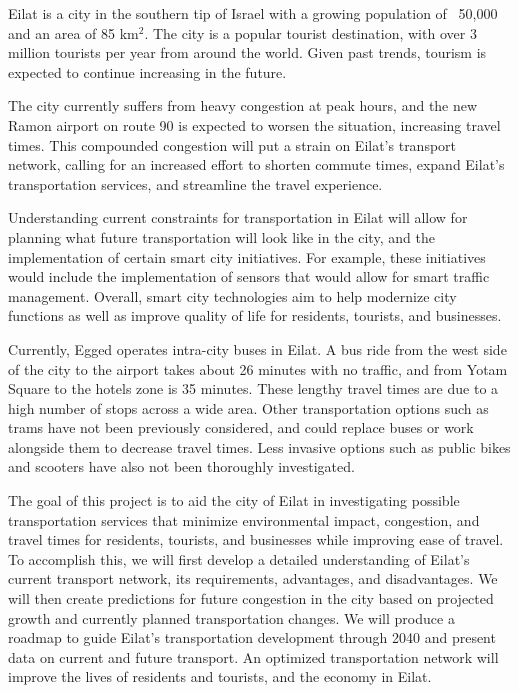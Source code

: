 \documentclass[12pt]{article}                         %
\begin{document}
Eilat is a city in the southern tip of Israel with a growing population of ~50,000 and an area of 85 km$^2$. The city is a popular tourist destination, with over 3 million tourists per year from around the world. Given past trends, tourism is expected to continue increasing in the future.

The city currently suffers from heavy congestion at peak hours, and the new Ramon airport on route 90 is expected to worsen the situation, increasing travel times. This compounded congestion will put a strain on Eilat's transport network, calling for an increased effort to shorten commute times, expand Eilat's transportation services, and streamline the travel experience.

Understanding current constraints for transportation in Eilat will allow for planning what future transportation will look like in the city, and the implementation of certain smart city initiatives. For example, these initiatives would include the implementation of sensors that would allow for smart traffic management. Overall, smart city technologies aim to help modernize city functions as well as improve quality of life for residents, tourists, and businesses.

Currently, Egged operates intra-city buses in Eilat. A bus ride from the west side of the city to the airport takes about 26 minutes with no traffic, and from Yotam Square to the hotels zone is 35 minutes. These lengthy travel times are due to a high number of stops across a wide area. Other transportation options such as trams have not been previously considered, and could replace buses or work alongside them to decrease travel times. Less invasive options such as public bikes and scooters have also not been thoroughly investigated.

The goal of this project is to aid the city of Eilat in investigating possible transportation services that minimize environmental impact, congestion, and travel times for residents, tourists, and businesses while improving ease of travel. To accomplish this, we will first develop a detailed understanding of Eilat's current transport network, its requirements, advantages, and disadvantages. We will then create predictions for future congestion in the city based on projected growth and currently planned transportation changes. We will produce a roadmap to guide Eilat's transportation development through 2040 and present data on current and future transport. An optimized transportation network will improve the lives of residents and tourists, and the economy in Eilat.
 
\end{document}
